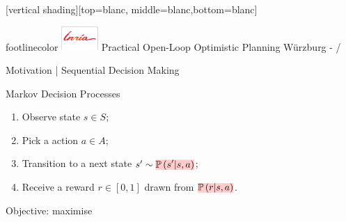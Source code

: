 \documentclass{beamer}
\begin{document}
[vertical shading][top=blanc, middle=blanc,bottom=blanc]
{
\begin{beamercolorbox}[wd=1\paperwidth,ht=15.5pt]{footlinecolor}
		\hspace{3mm}
		\includegraphics[width=14mm]{inria/logobastrans}
		\hspace{.4cm}
		\raisebox{3.2ex}
		{\scriptsize Practical Open-Loop Optimistic Planning}\hfill
		\raisebox{3.2ex}
		{Würzburg - \insertframenumber/\inserttotalframenumber \hspace{5mm}
			\null }
\end{beamercolorbox}
}

\begin{frame}{Motivation | Sequential Decision Making}

\begin{block}{Markov Decision Processes}
\begin{enumerate}
    \item Observe state $s\in S$;
    \item Pick a  action $a\in A$;
    \item Transition to a next state $s'\sim \hler{\probability{s'|s,a}}$;
    \item Receive a  reward $r\in[0, 1]$ drawn from $\hler{\probability{r|s, a}}$.
\end{enumerate}
\begin{center}
    Objective: maximise 
\end{center}
\end{block}

\end{frame}
\end{document}
